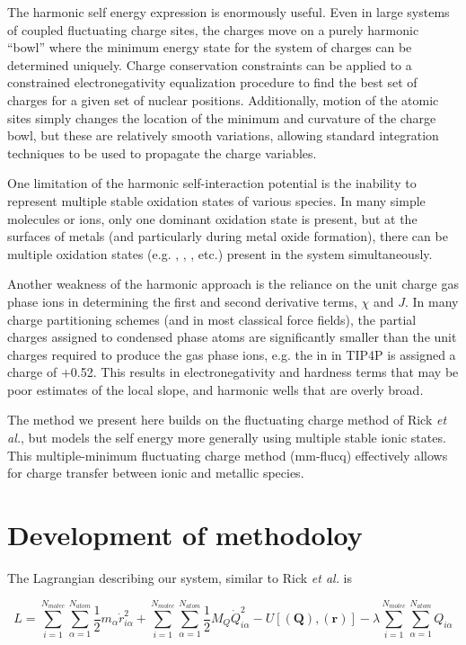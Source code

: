 The harmonic self energy expression is enormously useful. Even in
large systems of coupled fluctuating charge sites, the charges move on
a purely harmonic ``bowl'' where the minimum energy state for the
system of charges can be determined uniquely. Charge conservation
constraints can be applied to a constrained electronegativity
equalization procedure to find the best set of charges for a given set
of nuclear positions.  Additionally, motion of the atomic sites simply
changes the location of the minimum and curvature of the charge bowl,
but these are relatively smooth variations, allowing standard
integration techniques to be used to propagate the charge variables.

One limitation of the harmonic self-interaction potential is the
inability to represent multiple stable oxidation states of various
species. In many simple molecules or ions, only one dominant oxidation
state is present, but at the surfaces of metals (and particularly
during metal oxide formation), there can be multiple oxidation states
(e.g. , , , etc.) present in the system simultaneously.

Another weakness of the harmonic approach is the reliance on the unit
charge gas phase ions in determining the first and second derivative terms, $\chi$ and $J$.  In
many charge partitioning schemes (and in most classical force fields),
the partial charges assigned to condensed phase atoms are
significantly smaller than the unit charges required to produce the gas phase
ions, e.g. the  in  in TIP4P is assigned a charge of +0.52.\citep{}  This
results in electronegativity and hardness terms that may be poor estimates of the local
slope, and harmonic wells that are overly broad.

The method we present here builds on the fluctuating charge
method of Rick {\it et al.}\citep{Rick:1994ss}, but models the self energy more
generally using multiple stable ionic states.  This multiple-minimum
fluctuating charge method (mm-flucq) effectively allows for charge
transfer between ionic and metallic species.

\section{Development of methodoloy}

The Lagrangian describing our system, similar to Rick {\it et al.}\citep{Rick:1994ss} is

\begin{equation}
L = \sum^{N_{molec}}_{i=1}\sum^{N_{atom}}_{\alpha = 1} \frac{1}{2}m_{\alpha} \dot{r}^2_{i\alpha} + \sum^{N_{molec}}_{i=1}\sum^{N_{atom}}_{\alpha = 1} \frac{1}{2}M_Q\dot{Q}^2_{i\alpha} - U[(\mathbf{Q}),(\mathbf{r})] - \lambda \sum^{N_{molec}}_{i=1}\sum^{N_{atom}}_{\alpha = 1} Q_{i\alpha}
\end{equation}

